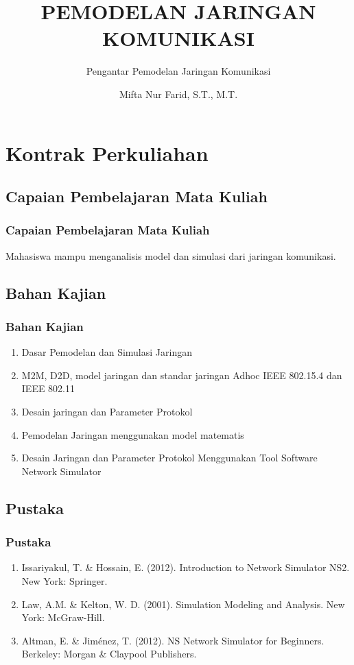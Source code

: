 \documentclass[pdflatex,compress]{beamer}
\title{PEMODELAN JARINGAN KOMUNIKASI}
\subtitle{Pengantar Pemodelan Jaringan Komunikasi}
\author{Mifta Nur Farid, S.T., M.T.}
\begin{document}
\maketitle


\section{Kontrak Perkuliahan}

\subsection{Capaian Pembelajaran Mata Kuliah}

\begin{frame}
	\frametitle{Capaian Pembelajaran Mata Kuliah}
	Mahasiswa mampu menganalisis model dan simulasi dari jaringan komunikasi.
\end{frame}

\subsection{Bahan Kajian}

\begin{frame}
	\frametitle{Bahan Kajian}
	\begin{enumerate}
		\item Dasar Pemodelan dan Simulasi Jaringan
		\item M2M, D2D, model jaringan dan standar jaringan Adhoc IEEE 802.15.4 dan IEEE 802.11
		\item Desain jaringan dan Parameter Protokol
		\item Pemodelan Jaringan menggunakan model matematis
		\item Desain Jaringan dan Parameter Protokol Menggunakan Tool Software Network Simulator
	\end{enumerate}
\end{frame}

\subsection{Pustaka}

\begin{frame}
	\frametitle{Pustaka}
	\begin{enumerate}
		\item Issariyakul, T. \& Hossain, E. (2012). Introduction to Network Simulator NS2. New York: Springer.
		\item Law, A.M. \& Kelton, W. D. (2001). Simulation Modeling and Analysis. New York: McGraw-Hill.
		\item Altman, E. \& Jiménez, T. (2012). NS Network Simulator for Beginners. Berkeley: Morgan \& Claypool
		Publishers.
	\end{enumerate}
\end{frame}
\end{document}

